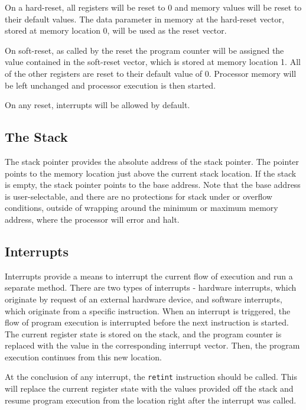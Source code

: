 \documentclass{article}
\begin{document}
On a hard-reset, all registers will be reset to 0 and memory values will be reset to their default values. The data parameter in memory at the hard-reset vector, stored at memory location 0, will be used as the reset vector.

On soft-reset, as called by the reset the program counter will be assigned the value contained in the soft-reset vector, which is stored at memory location 1. All of the other registers are reset to their default value of 0. Processor memory will be left unchanged and processor execution is then started.

On any reset, interrupts will be allowed by default.

\subsection{The Stack}
\label{sec:the-stack}

The stack pointer provides the absolute address of the stack pointer. The pointer points to the memory location just above the current stack location. If the stack is empty, the stack pointer points to the base address. Note that the base address is user-selectable, and there are no protections for stack under or overflow conditions, outside of wrapping around the minimum or maximum memory address, where the processor will error and halt.

\subsection{Interrupts}

Interrupts provide a means to interrupt the current flow of execution and run a separate method. There are two types of interrupts - hardware interrupts, which originate by request of an external hardware device, and software interrupts, which originate from a specific instruction. When an interrupt is triggered, the flow of program execution is interrupted before the next instruction is started. The current register state is stored on the stack, and the program counter is replaced with the value in the corresponding interrupt vector. Then, the program execution continues from this new location.

At the conclusion of any interrupt, the \texttt{retint} instruction should be called. This will replace the current register state with the values provided off the stack and resume program execution from the location right after the interrupt was called.
\end{document}
